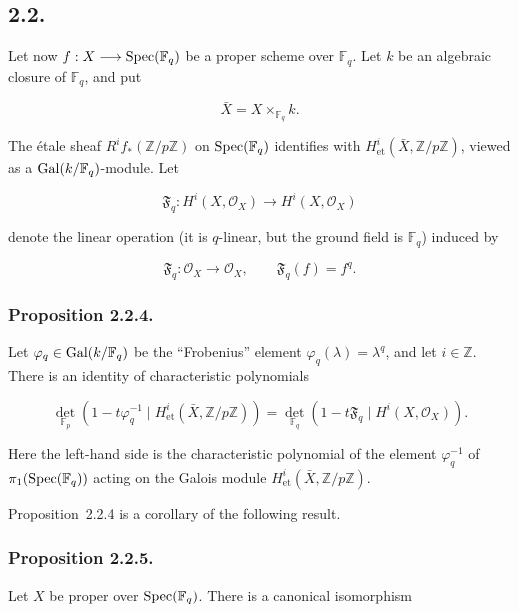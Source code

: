 \subsection*{2.2.}
Let now $f:X\longrightarrow\operatorname{Spec}(\mathbb F_q)$ be a proper scheme over
$\mathbb F_q$. Let $k$ be an algebraic closure of $\mathbb F_q$, and put

\begin{equation}\tag{2.2.1}
\bar X=X\times_{\mathbb F_q}k.
\end{equation}

The étale sheaf $R^if_*(\mathbb Z/p\mathbb Z)$ on
$\operatorname{Spec}(\mathbb F_q)$ identifies with
$H^i_{\mathrm{et}}(\bar X,\mathbb Z/p\mathbb Z)$, viewed as a
$\operatorname{Gal}(k/\mathbb F_q)$-module. Let

\begin{equation}\tag{2.2.2}
\mathfrak F_q:H^i(X,\mathcal O_X)\longrightarrow H^i(X,\mathcal O_X)
\end{equation}

denote the linear operation (it is $q$-linear, but the ground field is
$\mathbb F_q$) induced by

\begin{equation}\tag{2.2.3}
\mathfrak F_q:\mathcal O_X\longrightarrow\mathcal O_X,
\qquad \mathfrak F_q(f)=f^q.
\end{equation}

\subsubsection*{Proposition 2.2.4.}
Let $\varphi_q\in\operatorname{Gal}(k/\mathbb F_q)$ be the ``Frobenius'' element
$\varphi_q(\lambda)=\lambda^q$, and let $i\in\mathbb Z$. There is an
identity of characteristic polynomials

\begin{equation}\tag{2.2.4.1}
\det_{\mathbb F_p}\!\left(
1-t\varphi_q^{-1}\mid H^i_{\mathrm{et}}(\bar X,\mathbb Z/p\mathbb Z)
\right)
=
\det_{\mathbb F_q}\!\left(
1-t\mathfrak F_q\mid H^i(X,\mathcal O_X)
\right).
\end{equation}

Here the left-hand side is the characteristic polynomial of the element
$\varphi_q^{-1}$ of $\pi_1(\operatorname{Spec}(\mathbb F_q))$ acting on the Galois module
$H^i_{\mathrm{et}}(\bar X,\mathbb Z/p\mathbb Z)$.

Proposition~2.2.4 is a corollary of the following result.

\subsubsection*{Proposition 2.2.5.}
Let $X$ be proper over $\operatorname{Spec}(\mathbb F_q)$. There is a canonical
isomorphism

